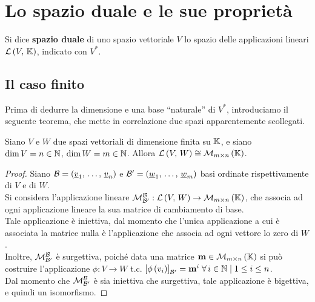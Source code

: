 \documentclass[a4paper]{article}
\newcommand{\dual}[1]{#1^{*}}
\begin{document}
\section{Lo spazio duale e le sue proprietà}

\begin{definition}
Si dice \textbf{spazio duale} di uno spazio vettoriale $V$
lo spazio delle applicazioni lineari $\mathcal{L} \left(V, \, \mathbb{K}\right)$, indicato con $\dual V$.
\end{definition}

\subsection{Il caso finito}

Prima di dedurre la dimensione e una base ``naturale'' di
$\dual V$, introduciamo il seguente teorema, che mette
in correlazione due spazi apparentemente scollegati.

\vskip 10pt

\begin{theorem} Siano $V$ e $W$ due spazi vettoriali di dimensione finita su $\mathbb{K}$, e siano $\dim V = n \in \mathbb{N}$, $\dim W = m \in \mathbb{N}$. Allora $\mathcal{L} \left(V, \, W\right) \cong \mathcal{M}_{m \times n}\left(\mathbb{K}\right)$.
\label{isom}
\end{theorem}

\begin{proof}
Siano $\mathcal{B} = \left(\underline{v}_1, \, \dots, \, \underline{v}_n\right)$ e
$\mathcal{B}' = \left(\underline{w}_1, \, \dots, \, \underline{w}_m\right)$ 
basi ordinate rispettivamente di $V$ e di $W$. \\

Si considera l'applicazione lineare
$\mathcal{M}^{\mathcal{B}}_{\mathcal{B}'} : \mathcal{L} \left(V, \, W\right) \to \mathcal{M}_{m \times n}\left(\mathbb{K}\right)$, che
associa ad ogni applicazione lineare la sua matrice di
cambiamento di base. \\

Tale applicazione è iniettiva, dal momento che l'unica
applicazione a cui è associata la matrice nulla è l'applicazione
che associa ad ogni vettore lo zero di $W$. \\

Inoltre, $\mathcal{M}^{\mathcal{B}}_{\mathcal{B}'}$ è surgettiva, poiché data una
matrice $\mathbf{m} \in \mathcal{M}_{m \times n}\left(\mathbb{K}\right)$ si può costruire l'applicazione
$\phi : V \to W$ t.c. $\left[ \phi \left( v_i \right) \right]_{\mathcal{B}'} = \mathbf{m}^i \; \forall \, i \in \mathbb{N} \mid 1 \leq i \leq n$. \\

Dal momento che $\mathcal{M}^{\mathcal{B}}_{\mathcal{B}'}$ è sia iniettiva che
surgettiva, tale applicazione è bigettiva, e quindi
un isomorfismo.
\end{proof}
\end{document}
